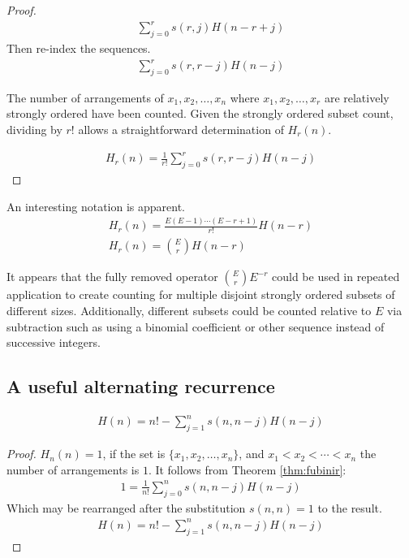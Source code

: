 \documentclass[12pt,reqno]{article}
\begin{document}
\begin{theorem}
\begin{proof}
		\begin{align}
			\sum_{j = 0}^{r} s(r,j) H(n - r + j)
		\end{align}
		Then re-index the sequences.
		\begin{align}
			\sum_{j = 0}^{r} s(r,r - j) H(n - j)
		\end{align}

		The number of arrangements of $x_{1}, x_{2}, \ldots, x_{n}$ where $x_{1}, x_{2}, \ldots, x_{r}$ are relatively strongly ordered have been counted. Given the strongly ordered subset count, dividing by $r!$ allows a straightforward determination of $H_{r}(n)$.

		\begin{align}
			H_{r} (n) = \frac{1}{r!}\sum_{j = 0}^{r} s(r,r - j) H(n - j) \nonumber
		\end{align}

	\end{proof}

\end{theorem}

An interesting notation is apparent.
\begin{align}
	H_{r} (n)  = \frac{E (E - 1) \cdots (E - r + 1)}{r!} H(n - r) \\
	H_{r} (n)  = \binom{E}{r} H(n - r) \label{eqn:binomform}
\end{align}

It appears that the fully removed operator $\binom{E}{r} E^{-r}$ could be used in repeated application to create counting for multiple disjoint strongly ordered subsets of different sizes. Additionally, different subsets could be counted relative to $E$ via subtraction such as using a binomial coefficient or other sequence instead of successive integers.

\subsection{A useful alternating recurrence}
\begin{corollary}

	\begin{align}
		H(n) = n!  - \sum_{j = 1}^{n} s(n,n - j) H(n - j)
	\end{align}
	\begin{proof}
		$H_{n}(n) = 1$, if the set is $\{x_{1}, x_{2},\ldots, x_{n}\}$, and $x_{1} < x_{2} < \cdots < x_{n}$ the number of arrangements is $1$. It follows from Theorem \ref{thm:fubinir}:
		\begin{align}
			1  = \frac{1}{n!}\sum_{j = 0}^{n} s(n,n - j) H(n - j) \label{eqn:matrixpredec}
		\end{align}
		Which may be rearranged after the substitution $s(n,n) = 1$ to the result.
		\begin{align}
			H(n)  = n! - \sum_{j = 1}^{n} s(n,n - j) H(n - j) \nonumber
		\end{align}
	\end{proof}
\end{corollary}
\end{document}
